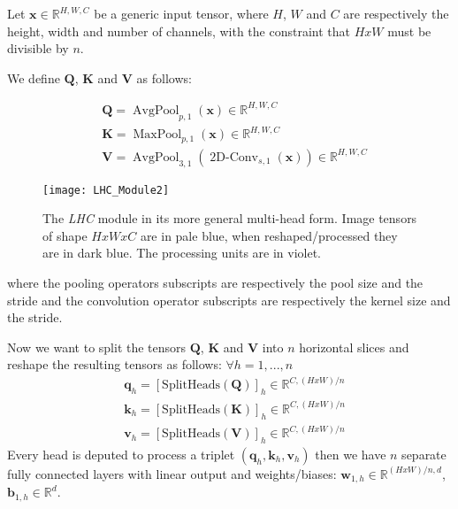 \documentclass[fleqn,10pt]{SelfArx}
\begin{document}
Let $\mathbf{x} \in \mathbb{R}^{H,W,C}$ be a generic input tensor, where $H$, $W$ and $C$ are respectively the height, width and number of channels, with the constraint that $HxW$ must be divisible by $n$.

We define $\mathbf{Q}$, $\mathbf{K}$ and $\mathbf{V}$ as follows:

\begin{align}
&\mathbf{Q} = \operatorname{AvgPool}_{p,1}(\mathbf{x}) \in \mathbb{R}^{H,W,C}\\
&\mathbf{K} = \operatorname{MaxPool}_{p,1}(\mathbf{x}) \in \mathbb{R}^{H,W,C}\\
&\mathbf{V} = \operatorname{AvgPool}_{3,1}(\operatorname{2D-Conv}_{s,1}(\mathbf{x})) \in \mathbb{R}^{H,W,C}
\end{align}

\begin{figure*}[ht]\centering \texttt{[image: LHC\_Module2]}
\caption{The \textit{LHC} module in its more general multi-head form. Image tensors of shape $HxWxC$ are in pale blue, when reshaped/processed they are in dark blue. The processing units are in violet.}
\end{figure*}

where the pooling operators subscripts are respectively the pool size and the stride and the convolution operator subscripts are respectively the kernel size and the stride.

Now we want to split the tensors $\mathbf{Q}$, $\mathbf{K}$ and $\mathbf{V}$ into $n$ horizontal slices and reshape the resulting tensors as follows:
$\forall h = 1, ..., n$
\begin{align}
             &\mathbf{q}_{h} = [\operatorname{SplitHeads(\mathbf{Q})}]_h \in \mathbb{R}^{C,(HxW)/n}\\
             &\mathbf{k}_{h} = [\operatorname{SplitHeads(\mathbf{K})}]_h \in \mathbb{R}^{C,(HxW)/n}\\
             &\mathbf{v}_{h} = [\operatorname{SplitHeads(\mathbf{V})}]_h \in \mathbb{R}^{C,(HxW)/n}
\end{align}
Every head is deputed to process a triplet $(\mathbf{q}_{h}, \mathbf{k}_{h}, \mathbf{v}_{h})$ then we have $n$ separate fully connected layers with linear output and weights/biases: 
$\mathbf{w}_{1,h} \in \mathbb{R}^{(HxW)/n, d}$, $\mathbf{b}_{1,h} \in \mathbb{R}^{d}$.
\end{document}
